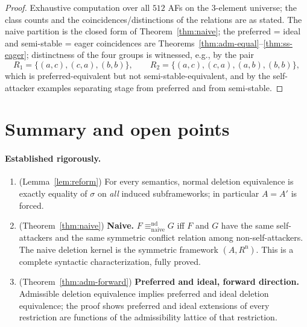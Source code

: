 \documentclass{amsart}
\theoremstyle{remark}
\begin{document}
\begin{proof}
Exhaustive computation over all $512$ AFs on the $3$-element universe; the class
counts and the coincidences/distinctions of the relations are as stated.  The
naive partition is the closed form of Theorem~\ref{thm:naive}; the preferred =
ideal and semi-stable = eager coincidences are
Theorems~\ref{thm:adm-equal}--\ref{thm:ss-eager}; distinctness of the four
groups is witnessed, e.g., by the pair
\[
R_1=\{(a,c),(c,a),(b,b)\},\qquad
R_2=\{(a,c),(c,a),(a,b),(b,b)\},
\]
which is preferred-equivalent but not semi-stable-equivalent, and by the
self-attacker examples separating stage from preferred and from semi-stable.
\end{proof}

\section{Summary and open points}\label{sec:status}

\paragraph{Established rigorously.}
\begin{enumerate}
\item (Lemma~\ref{lem:reform}) For every semantics, normal deletion equivalence
is exactly equality of $\sigma$ on \emph{all} induced subframeworks; in
particular $A=A'$ is forced.
\item (Theorem~\ref{thm:naive}) \textbf{Naive.} $F\equiv^{\mathrm{nd}}_
{\mathrm{naive}}G$ iff $F$ and $G$ have the same self-attackers and the same
symmetric conflict relation among non-self-attackers.  The naive deletion kernel
is the symmetric framework $(A,R^{\mathrm n})$.  This is a complete syntactic
characterization, fully proved.
\item (Theorem~\ref{thm:adm-forward}) \textbf{Preferred and ideal, forward
direction.} Admissible deletion equivalence implies preferred and ideal deletion
equivalence; the proof shows preferred and ideal extensions of every restriction
are functions of the admissibility lattice of that restriction.
\end{enumerate}
\end{document}

